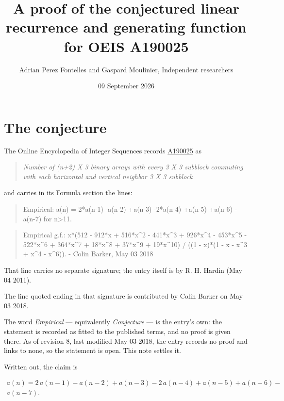 \documentclass[11pt]{article}
\title{A proof of the conjectured linear recurrence and generating function for OEIS A190025}
\author{Adrian Perez Fontelles and Gaspard Moulinier, Independent researchers}
\date{09 September 2026}
\theoremstyle{definition}
\begin{document}
\maketitle
\section{The conjecture}

The Online Encyclopedia of Integer Sequences records \href{https://oeis.org/A190025}{A190025} as

\begin{quote}\itshape Number of (n+2) X 3 binary arrays with every 3 X 3 subblock commuting with each horizontal and vertical neighbor 3 X 3 subblock\end{quote}

and carries in its Formula section the lines:

\begin{quote}\ttfamily Empirical: a(n) = 2*a(n-1) -a(n-2) +a(n-3) -2*a(n-4) +a(n-5) +a(n-6) -a(n-7) for n>11.\end{quote}

\begin{quote}\ttfamily Empirical g.f.: x*(512 - 912*x + 516*x\textasciicircum{}2 - 441*x\textasciicircum{}3 + 926*x\textasciicircum{}4 - 453*x\textasciicircum{}5 - 522*x\textasciicircum{}6 + 364*x\textasciicircum{}7 + 18*x\textasciicircum{}8 + 37*x\textasciicircum{}9 + 19*x\textasciicircum{}10) / ((1 - x)*(1 - x - x\textasciicircum{}3 + x\textasciicircum{}4 - x\textasciicircum{}6)). - Colin Barker, May 03 2018\end{quote}

That line carries no separate signature; the entry itself is by R. H. Hardin (May 04 2011).

The line quoted ending in that signature is contributed by Colin Barker on May 03 2018.

The word {\itshape Empirical} --- equivalently {\itshape Conjecture} --- is the entry's own: the statement is recorded as fitted to the published terms, and no proof is given there. As of revision 8, last modified May 03 2018, the entry records no proof and links to none, so the statement is open. This note settles it.

Written out, the claim is

\begin{multline*} a(n) = 2\,a(n-1) - a(n-2) + a(n-3) - 2\,a(n-4) + a(n-5) + a(n-6) - \\ a(n-7). \end{multline*}
\end{document}
